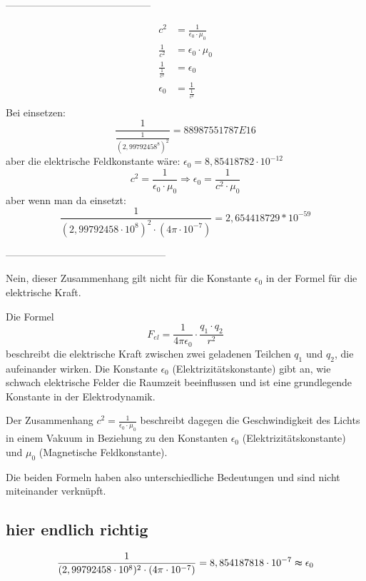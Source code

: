 \documentclass{report}
\begin{document}
--------------------------------------------

\begin{align}
c^2 &= \frac{1}{\epsilon_0 \cdot \mu_0} \\ %
\frac{1}{c^2} &= \epsilon_0 \cdot \mu_0 \\ %
\frac{1}{\frac{1}{c^2}} &= \epsilon_0 \\ %
\epsilon_0 &= \frac{1}{\frac{1}{c^2}} \\ %
\end{align}
Bei einsetzen:
\begin{equation*}
  \frac{1}{\frac{1}{(2,99792458^8)^2}} = 88987551787 E16
\end{equation*}
aber die elektrische Feldkonstante wäre: $\epsilon_0 = 8,85418782\cdot 10^{-12}$
\[c^2 = \frac{1}{\epsilon_0\cdot\mu_0}
\Rightarrow \epsilon_0 = \frac{1}{c^2\cdot\mu_0}
\]
aber wenn man da einsetzt:
\[\frac{1}{(2,99792458\cdot 10^8)^2\cdot (4\pi\cdot 10^{-7})}= 2,654418729*10^{-59}\]

------------------------------------------------

Nein, dieser Zusammenhang gilt nicht für die Konstante $\epsilon_0$ in der Formel
für die elektrische Kraft.

Die Formel 
\begin{equation}
  F_{el}=\frac{1}{4π\epsilon_0}\cdot\frac{q_1\cdot q_2}{r^2}
\end{equation}beschreibt die elektrische Kraft zwischen zwei geladenen Teilchen $q_1$ und $q_2$,
die aufeinander wirken. Die Konstante $\epsilon_0$ (Elektrizitätskonstante) gibt
an, wie schwach elektrische Felder die Raumzeit beeinflussen und ist eine
grundlegende Konstante in der Elektrodynamik.

Der Zusammenhang $c^2=\frac{1}{\epsilon_0\cdot\mu_0}$ beschreibt dagegen die
Geschwindigkeit des Lichts in einem Vakuum in Beziehung zu den Konstanten
$\epsilon_0$ (Elektrizitätskonstante) und $\mu_0$ (Magnetische Feldkonstante).

Die beiden Formeln haben also unterschiedliche Bedeutungen und sind nicht
miteinander verknüpft.
\subsection{hier endlich richtig}
\begin{equation*}
  \frac{1}{(2,99792458\cdot10^8)^2\cdot(4\pi\cdot 10^{-7})} = 8,854187818\cdot 10^{-7} \thickapprox \epsilon_0
\end{equation*}
\clearpage
\end{document}
